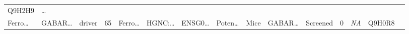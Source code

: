 \documentclass[
]{article}
\begin{document}
\begin{longtable}[]{@{}lllllllllllllll@{}}
\begin{minipage}[t]{0.05\columnwidth}
Q9H2H9\strut
\end{minipage} & \begin{minipage}[t]{0.02\columnwidth}\raggedright
\ldots{}\strut
\end{minipage}\tabularnewline
\begin{minipage}[t]{0.05\columnwidth}\raggedright
Ferro\ldots{}\strut
\end{minipage} & \begin{minipage}[t]{0.05\columnwidth}\raggedright
GABAR\ldots{}\strut
\end{minipage} & \begin{minipage}[t]{0.04\columnwidth}\raggedright
driver\strut
\end{minipage} & \begin{minipage}[t]{0.02\columnwidth}\raggedright
65\strut
\end{minipage} & \begin{minipage}[t]{0.05\columnwidth}\raggedright
Ferro\ldots{}\strut
\end{minipage} & \begin{minipage}[t]{0.05\columnwidth}\raggedright
HGNC:\ldots{}\strut
\end{minipage} & \begin{minipage}[t]{0.05\columnwidth}\raggedright
ENSG0\ldots{}\strut
\end{minipage} & \begin{minipage}[t]{0.05\columnwidth}\raggedright
Poten\ldots{}\strut
\end{minipage} & \begin{minipage}[t]{0.05\columnwidth}\raggedright
Mice\strut
\end{minipage} & \begin{minipage}[t]{0.05\columnwidth}\raggedright
GABAR\ldots{}\strut
\end{minipage} & \begin{minipage}[t]{0.05\columnwidth}\raggedright
Screened\strut
\end{minipage} & \begin{minipage}[t]{0.05\columnwidth}\raggedright
0\strut
\end{minipage} & \begin{minipage}[t]{0.05\columnwidth}\raggedright
\emph{NA}\strut
\end{minipage} & \begin{minipage}[t]{0.05\columnwidth}\raggedright
Q9H0R8\strut
\end{minipage} & \begin{minipage}[t]{0.02\columnwidth}\raggedright

\end{minipage}
\end{longtable}
\end{document}
